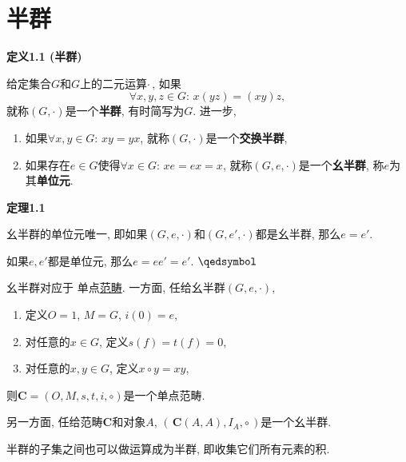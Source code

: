 \documentclass[UTF8]{ctexart}
\begin{document}
\setlength{\abovedisplayskip}{1pt}
\setlength{\belowdisplayskip}{1pt}

\section{半群}

\hypertarget{sec:定义1.1}{}
\noindent\textbf{定义1.1 (半群)}

给定集合$G$和$G$上的二元运算$\cdot$\,, 如果
\[
    \forall x,y,z\in G:\,x(yz)=(xy)z,
\]
就称$(G,\cdot)$是一个\textbf{半群}, 有时简写为$G$. 进一步,
\begin{enumerate}
    \item 如果$\forall x,y\in G:\,xy=yx$, 就称$(G,\cdot)$是一个\textbf{交换半群},
    \item 如果存在$e\in G$使得$\forall x\in G:\,xe=ex=x$,
    就称$(G,e,\cdot)$是一个\textbf{幺半群}, 称$e$为其\textbf{单位元}.
\end{enumerate}

\vspace{10pt}

\hypertarget{sec:定理1.1}{}
\noindent\textbf{定理1.1}

幺半群的单位元唯一, 即如果$(G,e,\cdot)$和$(G,e',\cdot)$都是幺半群, 那么$e=e'$.


如果$e,e'$都是单位元, 那么$e=ee'=e'$. \hfill $\qedsymbol$

\vspace{10pt}

幺半群对应于
单点\href{../../../02 范畴论/01 范畴、函子与自然变换/01 范畴#nameddest=sec:定义1.1}
{范畴}. 一方面, 任给幺半群$(G,e,\cdot)$,
\begin{enumerate}
    \item 定义$O=1$, $M=G$, $i(0)=e$,
    \item 对任意的$x\in G$, 定义$s(f)=t(f)=0$,
    \item 对任意的$x,y\in G$, 定义$x\circ y=xy$,
\end{enumerate}
则$\mathbf{C}=(O,M,s,t,i,\circ)$是一个单点范畴.

另一方面, 任给范畴$\mathbf{C}$和对象$A$,
$(\,\mathbf{C}(A,A),I_A,\circ\,)$是一个幺半群.

\vspace{10pt}

半群的子集之间也可以做运算成为半群, 即收集它们所有元素的积.

\vspace{10pt}
\end{document}
